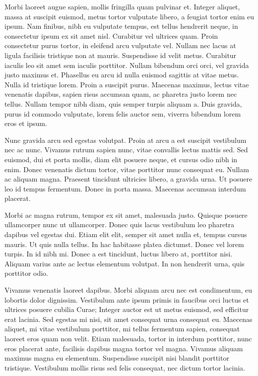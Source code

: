 \documentclass{article}
\begin{document}
  Morbi laoreet augue sapien, mollis fringilla quam pulvinar et. Integer aliquet, massa at suscipit euismod, metus tortor vulputate libero, a feugiat tortor enim eu ipsum. Nam finibus, nibh eu vulputate tempus, est tellus hendrerit neque, in consectetur ipsum ex sit amet nisl. Curabitur vel ultrices quam. Proin consectetur purus tortor, in eleifend arcu vulputate vel. Nullam nec lacus at ligula facilisis tristique non at mauris. Suspendisse id velit metus. Curabitur iaculis leo sit amet sem iaculis porttitor. Nullam bibendum orci orci, vel gravida justo maximus et. Phasellus eu arcu id nulla euismod sagittis at vitae metus. Nulla id tristique lorem. Proin a suscipit purus. Maecenas maximus, lectus vitae venenatis dapibus, sapien risus accumsan quam, ac pharetra justo lorem nec tellus. Nullam tempor nibh diam, quis semper turpis aliquam a. Duis gravida, purus id commodo vulputate, lorem felis auctor sem, viverra bibendum lorem eros et ipsum.\stopmsdata


  Nunc gravida arcu sed egestas volutpat. Proin at arcu a est suscipit vestibulum nec ac nunc. Vivamus rutrum sapien nunc, vitae convallis lectus mattis sed. Sed euismod, dui et porta mollis, diam elit posuere neque, et cursus odio nibh in enim. Donec venenatis dictum tortor, vitae porttitor nunc consequat eu. Nullam ac aliquam magna. Praesent tincidunt ultricies libero, a gravida urna. Ut posuere leo id tempus fermentum. Donec in porta massa. Maecenas accumsan interdum placerat.\stopmsdata


  Morbi ac magna rutrum, tempor ex sit amet, malesuada justo. Quisque posuere ullamcorper nunc ut ullamcorper. Donec quis lacus vestibulum leo pharetra dapibus vel egestas dui. Etiam elit elit, semper sit amet nulla et, tempus cursus mauris. Ut quis nulla tellus. In hac habitasse platea dictumst. Donec vel lorem turpis. In id nibh mi. Donec a est tincidunt, luctus libero at, porttitor nisi. Aliquam varius ante ac lectus elementum volutpat. In non hendrerit urna, quis porttitor odio.\stopmsdata


  Vivamus venenatis laoreet dapibus. Morbi aliquam arcu nec est condimentum, eu lobortis dolor dignissim. Vestibulum ante ipsum primis in faucibus orci luctus et ultrices posuere cubilia Curae; Integer auctor est ut metus euismod, sed efficitur erat lacinia. Sed egestas mi nisi, sit amet consequat urna consequat eu. Maecenas aliquet, mi vitae vestibulum porttitor, mi tellus fermentum sapien, consequat laoreet eros quam non velit. Etiam malesuada, tortor in interdum porttitor, nunc eros placerat ante, facilisis dapibus magna tortor vel magna. Vivamus aliquam maximus magna eu elementum. Suspendisse suscipit nisi blandit porttitor tristique. Vestibulum mollis risus sed felis consequat, nec dictum tortor lacinia.\stopmsdata
\end{document}
